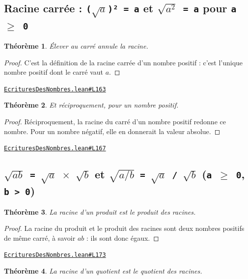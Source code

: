 \documentclass[11pt,a4paper]{article}
\theoremstyle{definition}
\theoremstyle{plain}
\newtheorem{theoreme}{Théorème}
\newcommand{\source}[2]{\par\smallskip\noindent\hfill{\footnotesize\href{#1}{\texttt{#2}}}\par\smallskip}
\begin{document}
\subsection{Racine carrée : \texttt{(\(\sqrt{a}\))² = a} et \texttt{\(\sqrt{a^{2}}\) = a} pour \texttt{a \(\ge\) 0}}

\begin{theoreme}
Élever au carré annule la racine.
\end{theoreme}

\begin{proof}
C'est la définition de la racine carrée d'un nombre positif : c'est l'unique
nombre positif dont le carré vaut $a$.
\end{proof}
\source{https://github.com/Commutator-IO/learn-lean/blob/main/courses/01-college/01-nombres-et-calculs/EcrituresDesNombres.lean\#L163}{EcrituresDesNombres.lean\#L163}

\begin{theoreme}
Et réciproquement, pour un nombre positif.
\end{theoreme}

\begin{proof}
Réciproquement, la racine du carré d'un nombre positif redonne ce nombre. Pour un
nombre négatif, elle en donnerait la valeur absolue.
\end{proof}
\source{https://github.com/Commutator-IO/learn-lean/blob/main/courses/01-college/01-nombres-et-calculs/EcrituresDesNombres.lean\#L167}{EcrituresDesNombres.lean\#L167}

\subsection{\texttt{\(\sqrt{ab}\) = \(\sqrt{a}\) \(\times\) \(\sqrt{b}\)} et \texttt{\(\sqrt{a/b}\) = \(\sqrt{a}\) / \(\sqrt{b}\)} (\texttt{a \(\ge\) 0}, \texttt{b > 0})}

\begin{theoreme}
La racine d'un produit est le produit des racines.
\end{theoreme}

\begin{proof}
La racine du produit et le produit des racines sont deux nombres positifs de même
carré, à savoir $ab$ : ils sont donc égaux.
\end{proof}
\source{https://github.com/Commutator-IO/learn-lean/blob/main/courses/01-college/01-nombres-et-calculs/EcrituresDesNombres.lean\#L173}{EcrituresDesNombres.lean\#L173}

\begin{theoreme}
La racine d'un quotient est le quotient des racines.
\end{theoreme}
\end{document}
